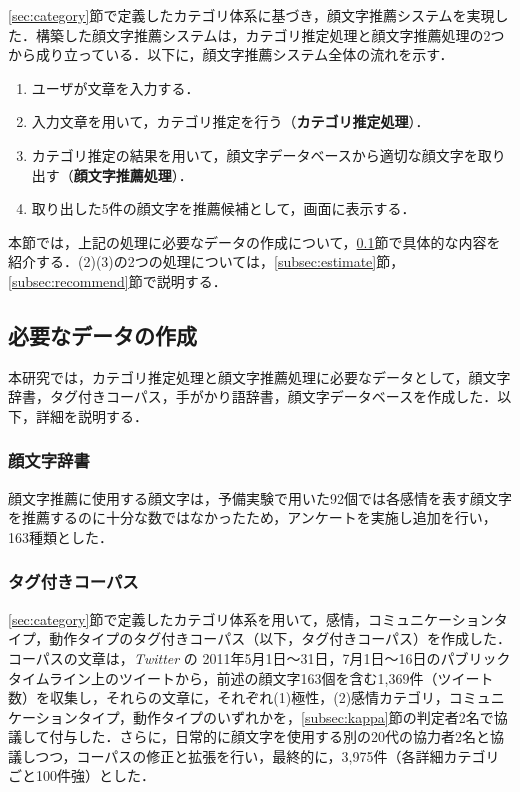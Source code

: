 \documentclass[japanese]{jnlp_1.4}
\begin{document}
\ref{sec:category}節で定義したカテゴリ体系に基づき，顔文字推薦システムを実現した．構築した顔文字推薦システムは，カテゴリ推定処理と顔文字推薦処理の2つから成り立っている．以下に，顔文字推薦システム全体の流れを示す．

\begin{enumerate}
\item ユーザが文章を入力する．
\item 入力文章を用いて，カテゴリ推定を行う（{\bf カテゴリ推定処理}）．
\item カテゴリ推定の結果を用いて，顔文字データベースから適切な顔文字を取り出す（{\bf 顔文字推薦処理}）．
\item 取り出した5件の顔文字を推薦候補として，画面に表示する．
\end{enumerate}

\noindent
本節では，上記の処理に必要なデータの作成について，\ref{subsec:data}節で具体的な内容を紹介する．(2)(3)の2つの処理については，\ref{subsec:estimate}節，\ref{subsec:recommend}節で説明する．


\subsection{必要なデータの作成}
\label{subsec:data}

本研究では，カテゴリ推定処理と顔文字推薦処理に必要なデータとして，顔文字辞書，タグ付きコーパス，手がかり語辞書，顔文字データベースを作成した．以下，詳細を説明する．


\subsubsection*{顔文字辞書}

顔文字推薦に使用する顔文字は，予備実験で用いた92個では各感情を表す顔文字を推薦するのに十分な数ではなかったため，アンケートを実施し追加を行い，163種類とした．


\subsubsection*{タグ付きコーパス}

\ref{sec:category}節で定義したカテゴリ体系を用いて，感情，コミュニケーションタイプ，動作タイプのタグ付きコーパス（以下，タグ付きコーパス）を作成した．コーパスの文章は，{\it Twitter} の 2011年5月1日〜31日，7月1日〜16日のパブリックタイムライン上のツイートから，前述の顔文字163個を含む1,369件（ツイート数）を収集し，それらの文章に，それぞれ(1)極性，(2)感情カテゴリ，コミュニケーションタイプ，動作タイプのいずれかを，\ref{subsec:kappa}節の判定者2名で協議して付与した．さらに，日常的に顔文字を使用する別の20代の協力者2名と協議しつつ，コーパスの修正と拡張を行い，最終的に，3,975件（各詳細カテゴリごと100件強）とした．
\end{document}
